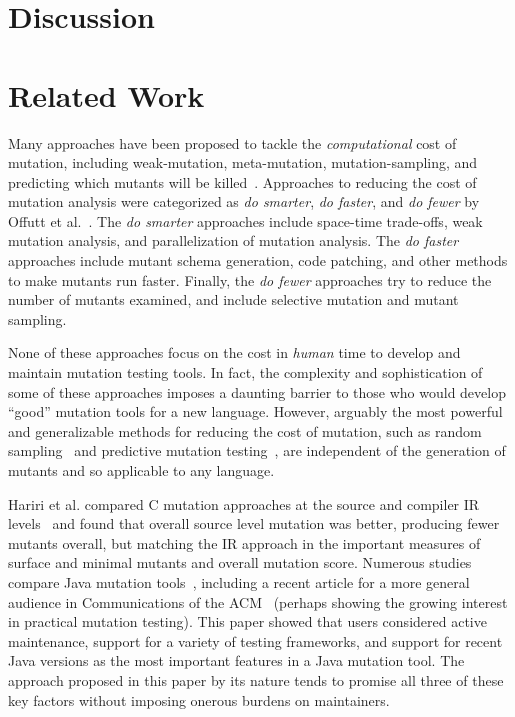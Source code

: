 \documentclass[sigconf,review, anonymous]{acmart}
\begin{document}
{\section{Discussion}

\section{Related Work}

Many approaches have been proposed to tackle the \emph{computational} cost of mutation, including weak-mutation, 
meta-mutation, mutation-sampling, and predicting which mutants will be
killed~\cite{offuttMutant1996,
  untch1993mutation,KaufmanFAKAJ2022,zhang2016pmt}.  Approaches to reducing the cost of
mutation analysis were categorized as \textit{do smarter}, \textit{do
faster}, and \textit{do fewer} by Offutt et al.~\cite{offutt2001mutation}.
The \textit{do smarter} approaches include space-time trade-offs, weak
mutation analysis, and parallelization of mutation analysis. The \textit{do
faster} approaches include mutant schema generation, code patching, and
other methods to make mutants run faster. Finally, the
\textit{do fewer} approaches try to reduce the number of mutants examined,
and include selective mutation and mutant sampling.

None of these approaches focus on the cost in \emph{human} time to
develop and maintain mutation testing tools.  In fact, the complexity
and sophistication of some of these approaches imposes a daunting
barrier to those who would develop ``good'' mutation tools for a new
language.  However, arguably the most powerful and generalizable
methods for reducing the cost of mutation, such as random sampling~\cite{GopinathSampleSize,gopinath2017mutation} and
predictive mutation testing~\cite{zhang2016pmt,kim2022predictive}, are independent of the generation of
mutants and so applicable to any language.

Hariri et al. compared C mutation approaches at the source and
compiler IR levels~\cite{CompareSrcBinary} and found that overall
source level mutation was better, producing fewer mutants overall, but
matching the IR approach in the important measures of surface and
minimal mutants and overall mutation score.  Numerous studies compare
Java mutation tools~\cite{MajorPIT,gopinath2017does}, including a
recent article for a more general audience in Communications of the
ACM~\cite{CommACMJavaTool} (perhaps showing the growing interest in
practical mutation testing).  This paper showed that users
considered active maintenance, support for a variety of testing
frameworks, and support for recent Java versions as the most important
features in a Java mutation tool.  The approach proposed in this paper
by its nature tends to promise all three of these key factors without
imposing onerous burdens on maintainers.

}
\end{document}
